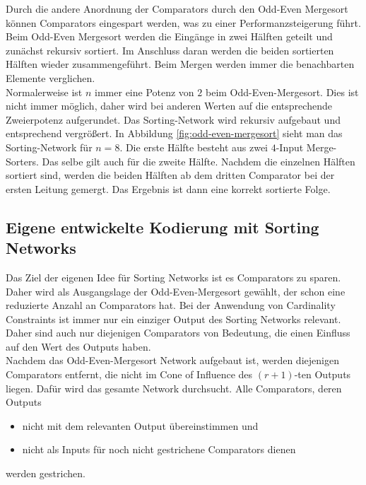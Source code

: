 \documentclass[a4,abstract=on]{scrartcl}
\begin{document}
Durch die andere Anordnung der Comparators durch den Odd-Even Mergesort können Comparators eingespart werden, was zu einer Performanzsteigerung führt. Beim Odd-Even Mergesort werden die Eingänge in zwei Hälften geteilt und zunächst rekursiv sortiert. Im Anschluss daran werden die beiden sortierten Hälften wieder zusammengeführt. Beim Mergen werden immer die benachbarten Elemente verglichen.\\
Normalerweise ist $n$ immer eine Potenz von $2$ beim Odd-Even-Mergesort. Dies ist nicht immer möglich, daher wird bei anderen Werten auf die entsprechende Zweierpotenz aufgerundet. Das Sorting-Network wird rekursiv aufgebaut und entsprechend vergrößert. In Abbildung \ref{fig:odd-even-mergesort} sieht man das Sorting-Network für $n=8$. Die erste Hälfte besteht aus zwei $4$-Input Merge-Sorters. Das selbe gilt auch für die zweite Hälfte. Nachdem die einzelnen Hälften sortiert sind, werden die beiden Hälften ab dem dritten Comparator bei der ersten Leitung gemergt. Das Ergebnis ist dann eine korrekt sortierte Folge.

	\subsection{Eigene entwickelte Kodierung mit Sorting Networks}
Das Ziel der eigenen Idee für Sorting Networks ist es Comparators zu sparen. Daher wird als Ausgangslage der Odd-Even-Mergesort gewählt, der schon eine reduzierte Anzahl an Comparators hat. Bei der Anwendung von Cardinality Constraints ist immer nur ein einziger Output des Sorting Networks relevant. Daher sind auch nur diejenigen Comparators von Bedeutung, die einen Einfluss auf den Wert des Outputs haben.\\
Nachdem das Odd-Even-Mergesort Network aufgebaut ist, werden diejenigen Comparators entfernt, die nicht im Cone of Influence des $(r+1)$-ten Outputs liegen. Dafür wird das gesamte Network durchsucht. Alle Comparators, deren Outputs
\begin{itemize}
\item nicht mit dem relevanten Output übereinstimmen und
\item nicht als Inputs für noch nicht gestrichene Comparators dienen
\end{itemize}
werden gestrichen. 
\end{document}
